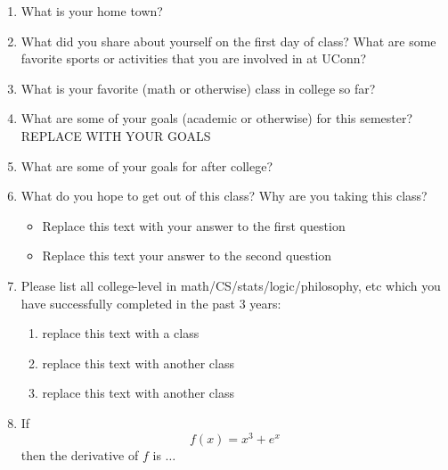 \documentclass[12pt]{amsart}
\begin{document}
\begin{enumerate}
\item What is your home town? 

\item What did you share about yourself on the first day of class?  What are some favorite sports or activities that you are involved in at UConn?

\item What is your favorite (math or otherwise) class in college so far?

\item What are some of your goals (academic or otherwise) for this semester?\\
REPLACE WITH YOUR GOALS

\item What are some of your goals for after college? 

\item What do you hope to get out of this class? Why are you taking this class?
\begin{itemize}
\item  Replace this text with your answer to the first question
\item  Replace this text your answer to the  second question
\end{itemize}

\item Please list all college-level in math/CS/stats/logic/philosophy, etc which you have successfully completed in the past 3 years:
\begin{enumerate}
\item replace this text with a class
\item replace this text with another class
\item replace this text with another class
\end{enumerate}

\item If 
\[ f(x) = x^3 + e^x \]
then the derivative of $f$ is $\dots$ 


\end{enumerate}
\end{document}
